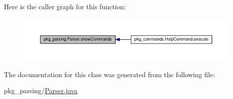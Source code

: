 Here is the caller graph for this function\-:
\nopagebreak
\begin{figure}[H]
\begin{center}
\leavevmode
\includegraphics[width=350pt]{classpkg__parsing_1_1Parser_a31545cdbdb409aaeb727289c0ea7be1b_icgraph}
\end{center}
\end{figure}




The documentation for this class was generated from the following file\-:\begin{DoxyCompactItemize}
\item 
pkg\-\_\-parsing/\hyperlink{Parser_8java}{Parser.\-java}\end{DoxyCompactItemize}
